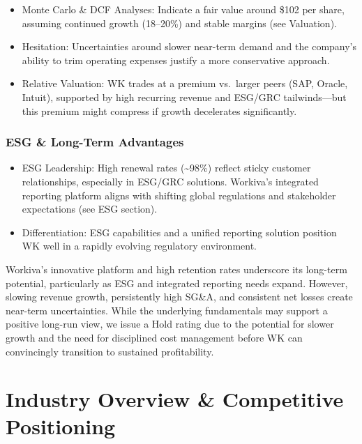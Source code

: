 \documentclass[
  10pt,
  a4paper,
]{article}
\providecommand{\tightlist}{%
  \setlength{\itemsep}{0pt}\setlength{\parskip}{0pt}}\usepackage{longtable,booktabs,array}
\begin{document}
\begin{itemize}
\tightlist
\item
  Monte Carlo \& DCF Analyses: Indicate a fair value around \$102 per
  share, assuming continued growth (18--20\%) and stable margins (see
  Valuation).
\item
  Hesitation: Uncertainties around slower near-term demand and the
  company's ability to trim operating expenses justify a more
  conservative approach.
\item
  Relative Valuation: WK trades at a premium vs.~larger peers (SAP,
  Oracle, Intuit), supported by high recurring revenue and ESG/GRC
  tailwinds---but this premium might compress if growth decelerates
  significantly.
\end{itemize}

\subsubsection{ESG \& Long-Term
Advantages}\label{esg-long-term-advantages}

\begin{itemize}
\tightlist
\item
  ESG Leadership: High renewal rates (\textasciitilde98\%) reflect
  sticky customer relationships, especially in ESG/GRC solutions.
  Workiva's integrated reporting platform aligns with shifting global
  regulations and stakeholder expectations (see ESG section).
\item
  Differentiation: ESG capabilities and a unified reporting solution
  position WK well in a rapidly evolving regulatory environment.
\end{itemize}

Workiva's innovative platform and high retention rates underscore its
long-term potential, particularly as ESG and integrated reporting needs
expand. However, slowing revenue growth, persistently high SG\&A, and
consistent net losses create near-term uncertainties. While the
underlying fundamentals may support a positive long-run view, we issue a
Hold rating due to the potential for slower growth and the need for
disciplined cost management before WK can convincingly transition to
sustained profitability.

\section{Industry Overview \& Competitive
Positioning}\label{industry-overview-competitive-positioning}
\end{document}
